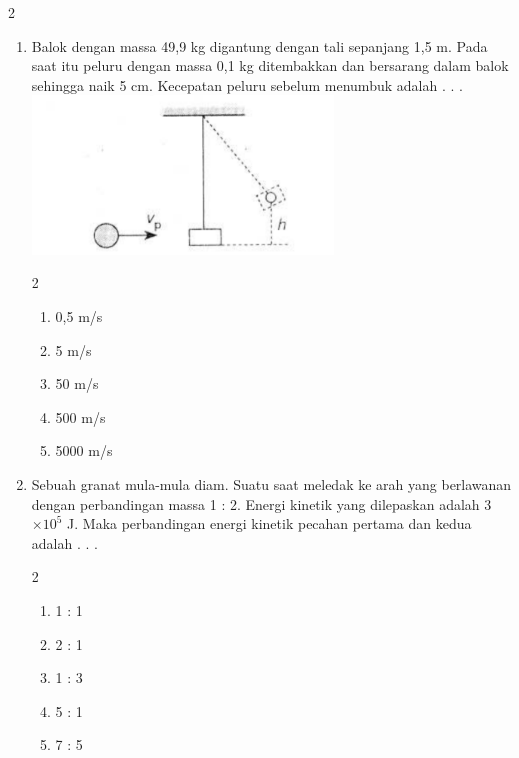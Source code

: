 \documentclass[10pt,a4paper]{extarticle}
\newcommand{\pilgani}[1]{                            \vspace{-0.3cm}\begin{multicols}{2}
 \begin{enumerate}[label=\Alph*., itemsep=0pt,topsep=0pt,leftmargin=*,align=Center]#1                     \end{enumerate}
 \phantom{ini cuma sapi, wedus, dan ayam}
 \end{multicols}}
\begin{document}
\begin{multicols*}{2}
\begin{enumerate}
\item Balok dengan massa 49,9 kg digantung dengan tali sepanjang 1,5 m. Pada saat itu peluru dengan massa 0,1 kg ditembakkan dan bersarang dalam balok sehingga naik 5 cm. Kecepatan peluru sebelum menumbuk adalah . . .\\
\includegraphics[width=8cm]{pic/mom3}
\pilgani{
        \item 0,5 m/s
        \item 5 m/s
        \item 50 m/s
        \item 500 m/s
        \item 5000 m/s
        }
\vspace{4cm}

\item Sebuah granat mula-mula diam. Suatu saat meledak ke arah yang berlawanan dengan perbandingan massa 1 : 2. Energi kinetik yang dilepaskan adalah 3$\times 10^5$ J. Maka perbandingan energi kinetik pecahan pertama dan kedua adalah . . .
\pilgani{
        \item 1 : 1
        \item 2 : 1
        \item 1 : 3
        \item 5 : 1
        \item 7 : 5
        }
\vspace{4cm}



\end{enumerate}



\end{multicols*}
\end{document}
